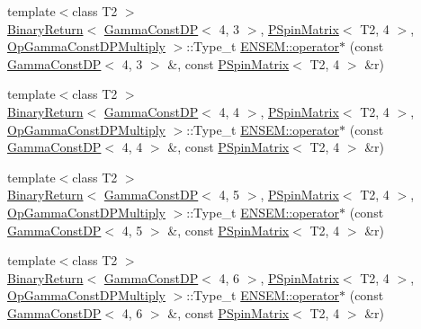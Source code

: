 \begin{DoxyCompactItemize}
\item 
{\footnotesize template$<$class T2 $>$ }\\\mbox{\hyperlink{structENSEM_1_1BinaryReturn}{Binary\+Return}}$<$ \mbox{\hyperlink{classENSEM_1_1GammaConstDP}{Gamma\+Const\+DP}}$<$ 4, 3 $>$, \mbox{\hyperlink{classENSEM_1_1PSpinMatrix}{P\+Spin\+Matrix}}$<$ T2, 4 $>$, \mbox{\hyperlink{structENSEM_1_1OpGammaConstDPMultiply}{Op\+Gamma\+Const\+D\+P\+Multiply}} $>$\+::Type\+\_\+t \mbox{\hyperlink{group__primspinmatrix_gae21434001730b61b41c47db91f4a45ba}{E\+N\+S\+E\+M\+::operator$\ast$}} (const \mbox{\hyperlink{classENSEM_1_1GammaConstDP}{Gamma\+Const\+DP}}$<$ 4, 3 $>$ \&, const \mbox{\hyperlink{classENSEM_1_1PSpinMatrix}{P\+Spin\+Matrix}}$<$ T2, 4 $>$ \&r)
\item 
{\footnotesize template$<$class T2 $>$ }\\\mbox{\hyperlink{structENSEM_1_1BinaryReturn}{Binary\+Return}}$<$ \mbox{\hyperlink{classENSEM_1_1GammaConstDP}{Gamma\+Const\+DP}}$<$ 4, 4 $>$, \mbox{\hyperlink{classENSEM_1_1PSpinMatrix}{P\+Spin\+Matrix}}$<$ T2, 4 $>$, \mbox{\hyperlink{structENSEM_1_1OpGammaConstDPMultiply}{Op\+Gamma\+Const\+D\+P\+Multiply}} $>$\+::Type\+\_\+t \mbox{\hyperlink{group__primspinmatrix_ga5399e919ac66849bae0231bd88b07167}{E\+N\+S\+E\+M\+::operator$\ast$}} (const \mbox{\hyperlink{classENSEM_1_1GammaConstDP}{Gamma\+Const\+DP}}$<$ 4, 4 $>$ \&, const \mbox{\hyperlink{classENSEM_1_1PSpinMatrix}{P\+Spin\+Matrix}}$<$ T2, 4 $>$ \&r)
\item 
{\footnotesize template$<$class T2 $>$ }\\\mbox{\hyperlink{structENSEM_1_1BinaryReturn}{Binary\+Return}}$<$ \mbox{\hyperlink{classENSEM_1_1GammaConstDP}{Gamma\+Const\+DP}}$<$ 4, 5 $>$, \mbox{\hyperlink{classENSEM_1_1PSpinMatrix}{P\+Spin\+Matrix}}$<$ T2, 4 $>$, \mbox{\hyperlink{structENSEM_1_1OpGammaConstDPMultiply}{Op\+Gamma\+Const\+D\+P\+Multiply}} $>$\+::Type\+\_\+t \mbox{\hyperlink{group__primspinmatrix_ga236159edb8e3e69f1a1813261364b3b3}{E\+N\+S\+E\+M\+::operator$\ast$}} (const \mbox{\hyperlink{classENSEM_1_1GammaConstDP}{Gamma\+Const\+DP}}$<$ 4, 5 $>$ \&, const \mbox{\hyperlink{classENSEM_1_1PSpinMatrix}{P\+Spin\+Matrix}}$<$ T2, 4 $>$ \&r)
\item 
{\footnotesize template$<$class T2 $>$ }\\\mbox{\hyperlink{structENSEM_1_1BinaryReturn}{Binary\+Return}}$<$ \mbox{\hyperlink{classENSEM_1_1GammaConstDP}{Gamma\+Const\+DP}}$<$ 4, 6 $>$, \mbox{\hyperlink{classENSEM_1_1PSpinMatrix}{P\+Spin\+Matrix}}$<$ T2, 4 $>$, \mbox{\hyperlink{structENSEM_1_1OpGammaConstDPMultiply}{Op\+Gamma\+Const\+D\+P\+Multiply}} $>$\+::Type\+\_\+t \mbox{\hyperlink{group__primspinmatrix_ga065100ce0a5fe4278e64d79e1b21c8c7}{E\+N\+S\+E\+M\+::operator$\ast$}} (const \mbox{\hyperlink{classENSEM_1_1GammaConstDP}{Gamma\+Const\+DP}}$<$ 4, 6 $>$ \&, const \mbox{\hyperlink{classENSEM_1_1PSpinMatrix}{P\+Spin\+Matrix}}$<$ T2, 4 $>$ \&r)

\end{DoxyCompactItemize}
